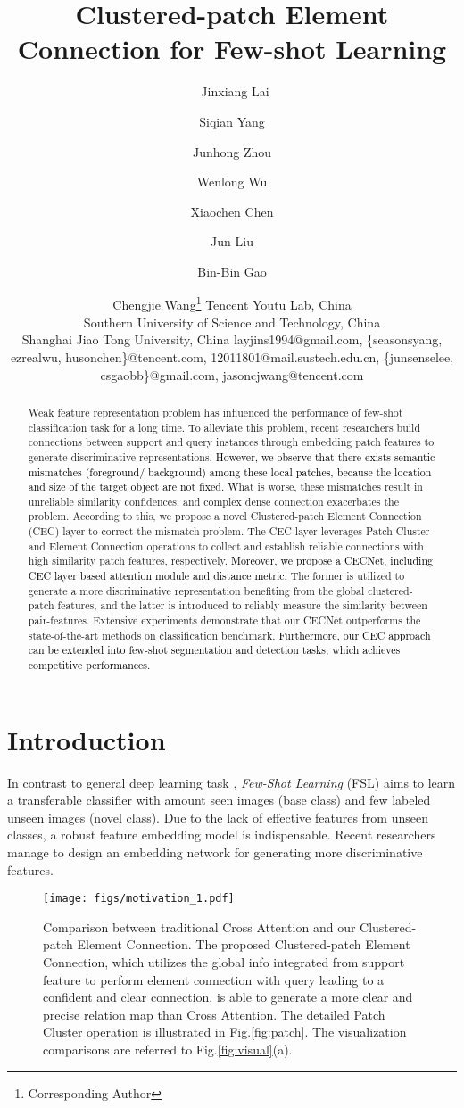 \documentclass{article}
\title{Clustered-patch Element Connection for Few-shot Learning}
\author{
\quad\quad\  Jinxiang Lai\and
Siqian Yang\and
Junhong Zhou\and
Wenlong Wu\and
Xiaochen Chen\and
\newline
Jun Liu\and
Bin-Bin Gao\and
Chengjie Wang\thanks{Corresponding Author} 
\affiliations
Tencent Youtu Lab, China\\
Southern University of Science and Technology, China\\
Shanghai Jiao Tong University, China
\emails
layjins1994@gmail.com, \{seasonsyang, ezrealwu, husonchen\}@tencent.com, 12011801@mail.sustech.edu.cn, \{junsenselee, csgaobb\}@gmail.com, jasoncjwang@tencent.com
}
\newcommand{\seasons}[1]{\textcolor{black}{#1}}
\newcommand{\jinxiang}[1]{\textcolor{black}{#1}}
\begin{document}
\maketitle

\begin{abstract}
Weak feature representation problem has influenced the performance of few-shot classification task for a long time.
To alleviate this problem, recent researchers build connections between support and query instances through embedding patch features to generate discriminative representations.
\seasons{However, we observe that there exists semantic mismatches (foreground/ background) among these local patches, because the location and size of the target object are not fixed.}
What is worse, these mismatches result in unreliable similarity confidences, and complex dense connection exacerbates the problem.
According to this, we propose a novel Clustered-patch Element Connection (CEC) layer to correct the mismatch problem.
The CEC layer leverages Patch Cluster and Element Connection operations to collect and establish reliable connections with high similarity patch features, respectively.
\jinxiang{Moreover, we propose a CECNet, including CEC layer based attention module and distance metric.}
The former is utilized to generate a more discriminative representation benefiting from the global clustered-patch features, and the latter is introduced to reliably measure the similarity between pair-features.
Extensive experiments demonstrate that our CECNet outperforms the state-of-the-art methods on classification benchmark.
\jinxiang{Furthermore, our CEC approach can be extended into few-shot segmentation and detection tasks, which achieves competitive performances.}
\end{abstract}

\section{Introduction}
\label{sec:Introduction}
In contrast to general deep learning task \cite{krizhevsky2012imagenet}, \textit{Few-Shot Learning} (FSL) aims to learn a transferable classifier with amount seen images (base class) and few labeled unseen images (novel class).
Due to the lack of effective features from unseen classes, a robust feature embedding model is indispensable.
Recent researchers\cite{hou2019cross,rizve2021exploring,xu2021learning} manage to design an embedding network for generating more discriminative features.

\begin{figure}[!t]
\centering
\texttt{[image: figs/motivation\_1.pdf]}
\caption{Comparison between traditional Cross Attention and our Clustered-patch Element Connection.
The proposed Clustered-patch Element Connection, which utilizes the global info  integrated from support feature  to perform element connection with query  leading to a confident and clear connection, is able to generate a more clear and precise relation map than Cross Attention.
The detailed Patch Cluster operation is illustrated in Fig.\ref{fig:patch}. The visualization comparisons are referred to Fig.\ref{fig:visual}(a).}
\label{fig:motivation}
\end{figure}
\end{document}
